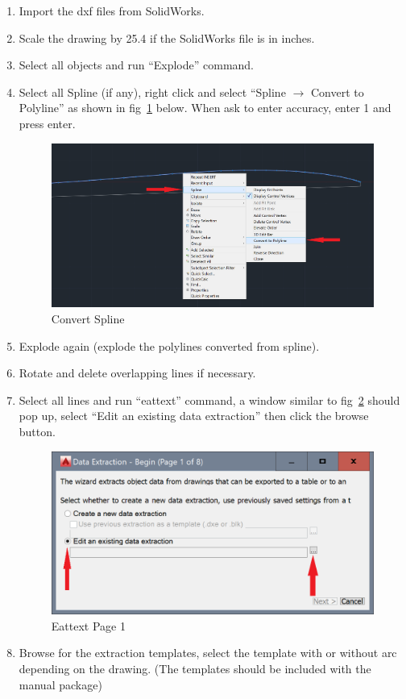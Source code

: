 \documentclass[titlepage,12pt,letter]{report}
\numberwithin{equation}{chapter}
\begin{document}
\begin{enumerate}[noitemsep,topsep=0pt]
	\item Import the dxf files from SolidWorks.
	\item Scale the drawing by 25.4 if the SolidWorks file is in inches.
	\item Select all objects and run ``Explode'' command.
	\item Select all Spline (if any), right click and select ``Spline $\rightarrow$ Convert to Polyline'' as shown in fig~\ref{fig:cad3} below. When ask to enter accuracy, enter 1 and press enter.
	\begin{figure} [H]
		\includegraphics[width = 0.9\linewidth]{./Figures/general_shape/cad3.png}
		\caption{Convert Spline}
		\label{fig:cad3}
	\end{figure}
	\item Explode again (explode the polylines converted from spline).
	\item Rotate and delete overlapping lines if necessary.
	\item Select all lines and run ``eattext'' command, a window similar to fig~\ref{fig:cad4} should pop up, select ``Edit an existing data extraction'' then click the browse button.
	\begin{figure} [H]
		\includegraphics[width = 0.6\linewidth]{./Figures/general_shape/cad4.png}
		\caption{Eattext Page 1}
		\label{fig:cad4}
	\end{figure}
	\item Browse for the extraction templates, select the template with or without arc depending on the drawing. (The templates should be included with the manual package)

\end{enumerate}
\end{document}

